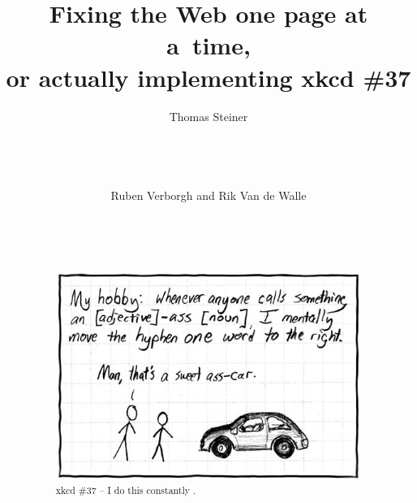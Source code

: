 \documentclass{sig-alternate}
\begin{document}
\title{Fixing the Web one page at a~time,\\ or actually implementing xkcd \#37}

\author{
\alignauthor
Thomas Steiner\\
	\\
	\\
	\\
	\\
\alignauthor
Ruben Verborgh and Rik Van de Walle\\
	\\
	\\
	\\
}
\maketitle

\begin{abstract}
\begin{figure}[h!]
\centering
\includegraphics[width=\columnwidth]{hyphen.jpg}
\caption{xkcd \#37 -- I do this constantly \cite{xkcd37}.}
\label{fig:xkcd37}
\end{figure}
\end{abstract}

\end{document}
